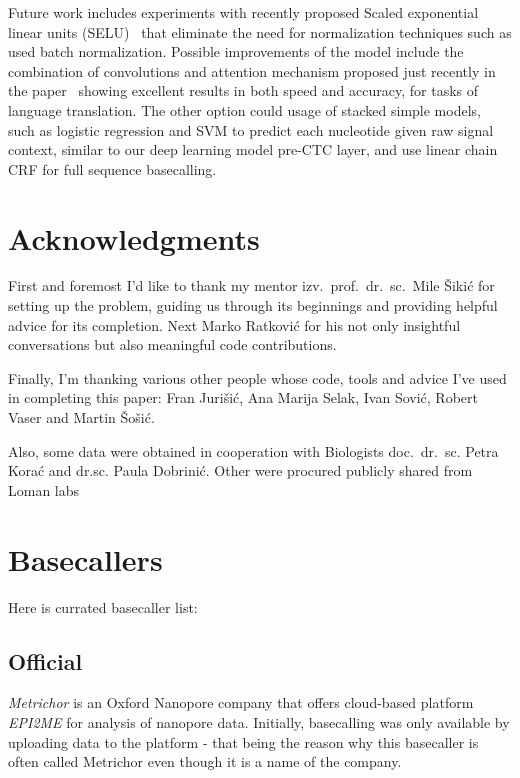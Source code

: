\documentclass[runningheads,a4paper]{llncs}
\begin{document}
Future work includes experiments with recently proposed Scaled exponential linear units (SELU)~\cite{selu} that eliminate the need for normalization techniques such as used batch normalization. Possible improvements of the model include the combination of convolutions and attention mechanism proposed just recently in the paper~\cite{facebook} showing excellent results in both speed and accuracy, for tasks of language translation. The other option could usage of stacked simple models, such as logistic regression and SVM to predict each nucleotide given raw signal context, similar to our deep learning model pre-CTC layer, and use linear chain CRF for full sequence basecalling.

\section{Acknowledgments}
First and foremost I'd like to thank my mentor izv.~prof.~dr.~sc.~Mile Šikić for setting up the problem, guiding us through its beginnings and providing helpful advice for its completion. Next Marko Ratković for his not only insightful conversations but also meaningful code contributions.

Finally, I'm thanking various other people whose code, tools and advice I've used in completing this paper: Fran Jurišić, Ana Marija Selak, Ivan Sović, Robert Vaser and Martin Šošić.

Also, some data were obtained in cooperation with Biologists doc.~dr.~sc. Petra Korać and dr.sc. Paula Dobrinić. Other were procured publicly shared from Loman labs~\cite{loman1-100k}

% 


\appendix
\section{Basecallers}\label{app:basecallers}
Here is currated basecaller list:

\subsection{Official}
\emph{Metrichor} is an Oxford Nanopore company that offers cloud-based platform \emph{EPI2ME} for analysis of nanopore data.
Initially, basecalling was only available by uploading data to the platform - that being the reason why this basecaller is often called Metrichor even though it is a name of the company.
\end{document}

